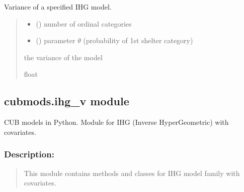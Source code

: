 \documentclass[letterpaper,10pt,english]{sphinxmanual}
\begin{document}
\begin{fulllineitems}
\label{\detokenize{cubmods:cubmods.ihg.var}}
\pysigstartsignatures
{}
\pysigstopsignatures
\sphinxAtStartPar
Variance of a specified IHG model.
\begin{quote}\begin{description}
\begin{itemize}
\item {} 
\sphinxAtStartPar
{} () \textendash{} number of ordinal categories

\item {} 
\sphinxAtStartPar
{} () \textendash{} parameter \(\theta\) (probability of 1st shelter category)

\end{itemize}

\sphinxAtStartPar
the variance of the model

\sphinxAtStartPar
float

\end{description}\end{quote}

\end{fulllineitems}



\subsection{cubmods.ihg\_v module}
\label{\detokenize{cubmods:module-cubmods.ihg_v}}\label{\detokenize{cubmods:cubmods-ihg-v-module}}\label{\detokenize{cubmods:ihgv-module}}
\sphinxAtStartPar
CUB models in Python.
Module for IHG (Inverse HyperGeometric) with covariates.


\subsubsection{Description:}
\label{\detokenize{cubmods:id82}}\begin{quote}

\sphinxAtStartPar
This module contains methods and classes
for IHG model family with covariates.
\end{quote}
\end{document}
